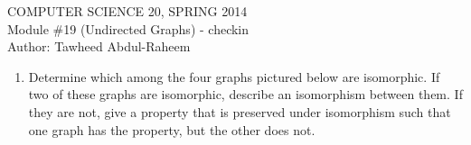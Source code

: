\documentclass[12pt]{article}
\begin{document}
\begin{center}
COMPUTER SCIENCE 20, SPRING 2014 \\
Module \#19 (Undirected Graphs) - checkin \\
Author: Tawheed Abdul-Raheem
\end{center}




\begin{enumerate}








\item Determine which among the four graphs pictured below are isomorphic.  If two of these graphs are
isomorphic, describe an isomorphism between them.  If they are not,
give a property that is preserved under isomorphism such that one
graph has the property, but the other does not.


\end{enumerate}
\end{document}
